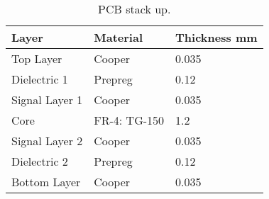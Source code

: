 \begin{table}[!h]
    \centering
    \begin{tabular}{L{0.3\columnwidth}L{0.3\columnwidth}L{0.3\columnwidth}}
        \toprule[1.5pt]
        \textbf{Layer}  & \textbf{Material}   & \textbf{Thickness mm} \\
        \midrule
        Top Layer       & Cooper              & 0.035                   \\
        Dielectric 1    & Prepreg             & 0.12                    \\
        Signal Layer 1  & Cooper              & 0.035                   \\
        Core            & FR-4: TG-150         & 1.2                     \\
        Signal Layer 2  & Cooper              & 0.035                   \\
        Dielectric 2    & Prepreg             & 0.12                    \\
        Bottom Layer    & Cooper              & 0.035                   \\
        \bottomrule[1.5pt]
    \end{tabular}
    \caption{PCB stack up.}
    \label{tab:pcb-stackup}
\end{table}